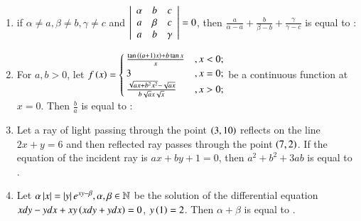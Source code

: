 \documentclass[journal]{IEEEtran}
\begin{document}
\begin{enumerate}[start=16]
\begin{enumerate}
\end{enumerate}
\item %
if $\alpha \neq a, \beta \neq b, \gamma \neq c$ and  
$\left\vert\begin{array}{ccc}
\alpha & b & c \\ a & \beta & c \\ a & b & \gamma \end{array}\right\vert =0 $, then $\frac{a}{\alpha - a}+\frac{b}{\beta - b}+\frac{\gamma}{\gamma - c}$ is equal to :
\begin{enumerate}
\end{enumerate}
\item %
For $a, b >0$,  let $f\left(x\right)= 
\begin{cases}
\frac{\tan{\ensuremath{\left(\left(a+1\right)x\right)}}+b\tan{x}}{x} &, x < 0; \\
3 &,  x = 0; \\
\frac{\sqrt{ax+b^2x^2} - \sqrt{ax}}{b\sqrt{a}x\sqrt{x}} &,  x>0;
\end{cases} $ 
be a continuous function at $x=0$. Then $\frac{b}{a}$ is equal to :
\begin{enumerate}
\end{enumerate}
\item %
Let a ray of light passing through the point $\left(3,10\right)$ reflects on the line $2x+y=6$ and then reflected ray passes through the point $\left(7,2\right)$. If the equation of the incident ray is $ax+by+1=0$, then $a^2+b^2+3ab$ is equal to \underline{\hspace{1cm}}.
\item %
Let $\alpha \left\vert x\right\vert = \left\vert y\right\vert e^{xy - \beta}, \alpha , \beta \in \mathbb{N} $ be the solution of the differential equation $xdy-ydx+xy\left(xdy+ydx\right) = 0$, $y\left(1\right) = 2 $. Then $\alpha + \beta $ is equal to \underline{\hspace{1cm}}.

\end{enumerate}
\end{document}

